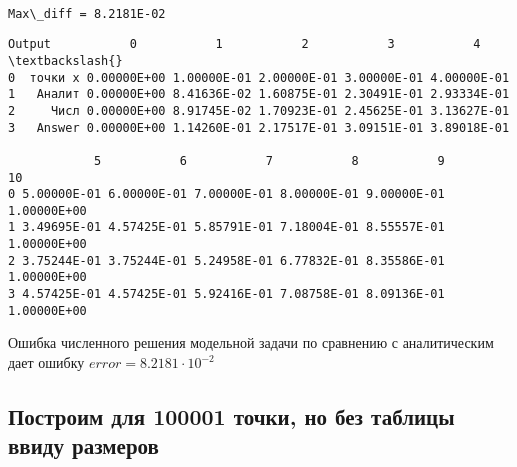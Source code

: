 \documentclass[11pt]{article}
\makeatletter
\newcommand{\boxspacing}{\kern\kvtcb@left@rule\kern\kvtcb@boxsep}
\newcommand{\prompt}[4]{
        {\ttfamily\llap{{\color{#2}[#3]:\hspace{3pt}#4}}\vspace{-\baselineskip}}
    }
\makeatother
\begin{document}
    \begin{center}
    \end{center}
    { \hspace*{\fill} \\}
    
    \begin{Verbatim}[commandchars=\\\{\}]
Max\_diff = 8.2181E-02
    \end{Verbatim}

            \begin{tcolorbox}[breakable, size=fbox, boxrule=.5pt, pad at break*=1mm, opacityfill=0]
\prompt{Out}{outcolor}{12}{\boxspacing}
\begin{Verbatim}[commandchars=\\\{\}]
    Output           0           1           2           3           4  \textbackslash{}
0  точки x 0.00000E+00 1.00000E-01 2.00000E-01 3.00000E-01 4.00000E-01
1   Аналит 0.00000E+00 8.41636E-02 1.60875E-01 2.30491E-01 2.93334E-01
2     Числ 0.00000E+00 8.91745E-02 1.70923E-01 2.45625E-01 3.13627E-01
3   Answer 0.00000E+00 1.14260E-01 2.17517E-01 3.09151E-01 3.89018E-01

            5           6           7           8           9          10
0 5.00000E-01 6.00000E-01 7.00000E-01 8.00000E-01 9.00000E-01 1.00000E+00
1 3.49695E-01 4.57425E-01 5.85791E-01 7.18004E-01 8.55557E-01 1.00000E+00
2 3.75244E-01 3.75244E-01 5.24958E-01 6.77832E-01 8.35586E-01 1.00000E+00
3 4.57425E-01 4.57425E-01 5.92416E-01 7.08758E-01 8.09136E-01 1.00000E+00
\end{Verbatim}
\end{tcolorbox}
        
    Ошибка численного решения модельной задачи по сравнению с аналитическим
дает ошибку \(error = 8.2181 \cdot 10^{-2}\)

    \hypertarget{ux43fux43eux441ux442ux440ux43eux438ux43c-ux434ux43bux44f-100001-ux442ux43eux447ux43aux438-ux43dux43e-ux431ux435ux437-ux442ux430ux431ux43bux438ux446ux44b-ux432ux432ux438ux434ux443-ux440ux430ux437ux43cux435ux440ux43eux432}{%
\subsection{Построим для 100001 точки, но без таблицы ввиду
размеров}\label{ux43fux43eux441ux442ux440ux43eux438ux43c-ux434ux43bux44f-100001-ux442ux43eux447ux43aux438-ux43dux43e-ux431ux435ux437-ux442ux430ux431ux43bux438ux446ux44b-ux432ux432ux438ux434ux443-ux440ux430ux437ux43cux435ux440ux43eux432}}
\end{document}
